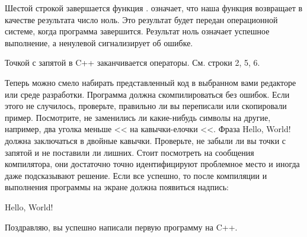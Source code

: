 \documentclass[book.tex]{subfiles}
\begin{document}
Шестой строкой завершается функция .  означает, что наша функция возвращает в качестве результата число ноль. Это результат будет передан операционной системе, когда программа завершится. Результат ноль означает успешное выполнение, а ненулевой сигнализирует об ошибке.

Точкой с запятой в C++ заканчивается операторы. См. строки 2, 5, 6.

Теперь можно смело набирать представленный код в выбранном вами редакторе или среде разработки. Программа должна скомпилироваться без ошибок. Если этого не случилось, проверьте, правильно ли вы переписали или скопировали пример. Посмотрите, не заменились ли какие-нибудь символы на другие, например, два уголка меньше <{}< на кавычки-елочки <<. Фраза Hello, World! должна заключаться в двойные кавычки. Проверьте, не забыли ли вы точки с запятой и не поставили ли лишних. Стоит посмотреть на сообщения компилятора, они достаточно точно идентифицируют проблемное место и иногда даже подсказывают решение. Если все успешно, то после компиляции и выполнения программы на экране должна появиться надпись:

Hello, World!

Поздравляю, вы успешно написали первую программу на C++.
\end{document}
